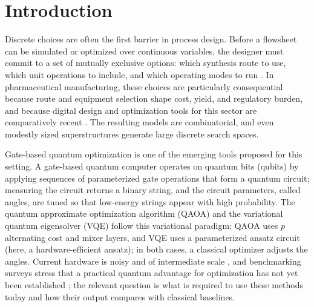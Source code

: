 \documentclass[10pt,letterpaper]{article}
\begin{document}

\section{Introduction}
\label{sec:ds-mfg-introduction}

Discrete choices are often the first barrier in process design.
Before a flowsheet can be simulated or optimized over continuous variables, the designer must commit to a set of mutually exclusive options: which synthesis route to use, which unit operations to include, and which operating modes to run \cite{Mencarelli_2020}.
In pharmaceutical manufacturing, these choices are particularly consequential because route and equipment selection shape cost, yield, and regulatory burden, and because digital design and optimization tools for this sector are comparatively recent \cite{CasasOrozco2021, Laky2022}.
The resulting models are combinatorial, and even modestly sized superstructures generate large discrete search spaces.

Gate-based quantum optimization is one of the emerging tools proposed for this setting.
A gate-based quantum computer operates on quantum bits (qubits) by applying sequences of parameterized gate operations that form a quantum circuit; measuring the circuit returns a binary string, and the circuit parameters, called angles, are tuned so that low-energy strings appear with high probability.
The quantum approximate optimization algorithm (QAOA) \cite{Farhi2014} and the variational quantum eigensolver (VQE) \cite{Peruzzo2014, Cerezo2021} follow this variational paradigm: QAOA uses $p$ alternating cost and mixer layers, and VQE uses a parameterized ansatz circuit (here, a hardware-efficient ansatz); in both cases, a classical optimizer adjusts the angles.
Current hardware is noisy and of intermediate scale \cite{Preskill2018}, and benchmarking surveys stress that a practical quantum advantage for optimization has not yet been established \cite{Abbas2024}; the relevant question is what is required to use these methods today and how their output compares with classical baselines.
\end{document}
